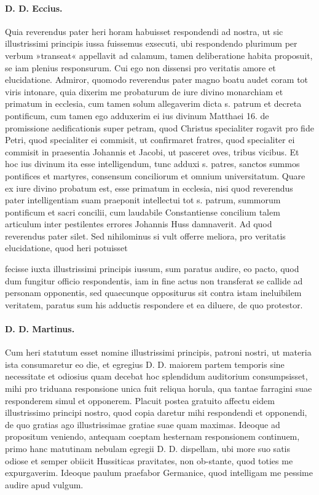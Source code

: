 \paragraph*{D. D. Eccius.}

Quia reverendus pater heri horam habuisset respondendi ad nostra, ut sic illustrissimi principis iussa fuissemus exsecuti, ubi respondendo plurimum per verbum »transeat« appellavit ad calamum, tamen deliberatione habita proposuit, se iam plenius responsurum. Cui ego non dissensi pro veritatis amore et elucidatione. Admiror, quomodo reverendus pater magno boatu audet coram tot viris intonare, quia dixerim me probaturum de iure divino monarchiam et primatum in ecclesia, cum tamen solum allegaverim dicta s. patrum et decreta pontificum, cum tamen ego adduxerim ei ius divinum Matthaei 16. de promissione aedificationis super petram, quod Christus specialiter rogavit pro fide Petri, quod specialiter ei commisit, ut confirmaret fratres, quod specialiter ei commisit in praesentia Johannis et Jacobi, ut pasceret oves, tribus vicibus. Et hoc ius divinum ita esse intelligendum, tunc adduxi s. patres, sanctos summos pontifices et martyres, consensum conciliorum et omnium universitatum. Quare ex iure divino probatum est, esse primatum in ecclesia, nisi quod reverendus pater intelligentiam suam praeponit intellectui tot s. patrum, summorum pontificum et sacri concilii, cum laudabile Constantiense concilium talem articulum inter pestilentes errores Johannis Huss damnaverit. Ad quod reverendus pater silet. Sed nihilominus si vult offerre meliora, pro veritatis elucidatione, quod heri potuisset

fecisse iuxta illustrissimi principis iussum, sum paratus audire, eo pacto, quod dum fungitur officio respondentis, iam in fine actus non transferat se callide ad personam opponentis, sed quaecunque oppositurus sit contra istam ineluibilem veritatem, paratus sum his adductis respondere et ea diluere, de quo protestor.

\paragraph*{D. D. Martinus.}

Cum heri statutum esset nomine illustrissimi principis, patroni nostri, ut materia ista consumaretur eo die, et egregius D. D. maiorem partem temporis sine necessitate et odiosius quam decebat hoc splendidum auditorium consumpsisset, mihi pro triduana responsione unica fuit reliqua horula, qua tantae farragini suae responderem simul et opponerem. Placuit postea gratuito affectu eidem illustrissimo principi nostro, quod copia daretur mihi respondendi et opponendi, de quo gratias ago illustrissimae gratiae suae quam maximas. Ideoque ad propositum veniendo, antequam coeptam hesternam responsionem continuem, primo hanc matutinam nebulam egregii D. D. dispellam, ubi more suo satis odiose et semper obiicit Hussiticas pravitates, non ob-\marginpar{\small[299]}stante, quod toties me expurgaverim. Ideoque paulum praefabor Germanice, quod intelligam me pessime audire apud vulgum.

